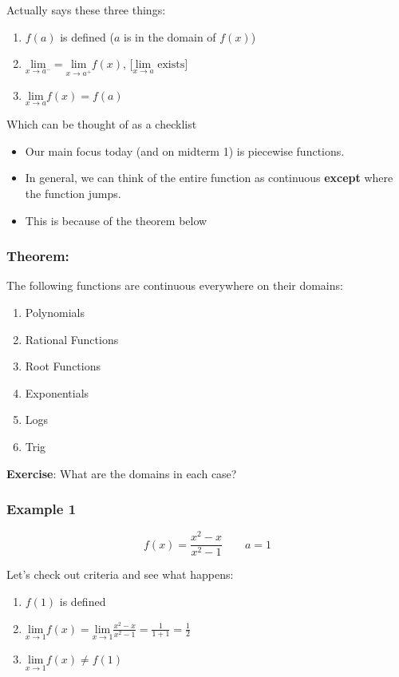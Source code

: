 \documentclass[11pt]{article}
\theoremstyle{plain}
\theoremstyle{definition}
\begin{document}
Actually says these three things:
\begin{enumerate}
	\item $f(a)$ is defined ($a$ is in the domain of $f(x)$)
	\item $\underset{x\rightarrow a^-}{\text{lim}}=\underset{x \rightarrow a^+}{\text{lim}} f(x)$, $\Big[\underset{x \rightarrow a}{\text{lim}}\text{ exists}\Big]$
	\item $\underset{x\rightarrow a}{\text{lim}}f(x)=f(a)$
\end{enumerate}
Which can be thought of as a checklist
\begin{itemize}
	\item Our main focus today (and on midterm 1) is piecewise functions.
	\item In general, we can think of the entire function as continuous \textbf{except} where the function jumps.
	\item This is because of the theorem below
\end{itemize}

\subsubsection{Theorem:} The following functions are continuous everywhere on their domains:
\begin{enumerate}
	\item Polynomials
	\item Rational Functions
	\item Root Functions
	\item Exponentials
	\item Logs
	\item Trig
\end{enumerate}

\textbf{Exercise}: What are the domains in each case?
 
 
 
 \subsubsection{Example 1}
 $$f(x)=\frac{x^2-x}{x^2-1} \qquad a=1$$
 
Let's check out criteria and see what happens:
 \begin{enumerate}
 	\item $f(1)$ is defined
 	\item $\underset{x \rightarrow 1}{\text{lim}}f(x) = \underset{x \rightarrow 1}{\text{lim}} \frac{x^2-x}{x^2-1} = \frac{1}{1+1}=\frac{1}{2}$
 	\item $\underset{x \rightarrow 1}{\text{lim}}f(x)\neq f(1)$
 \end{enumerate}
\end{document}
